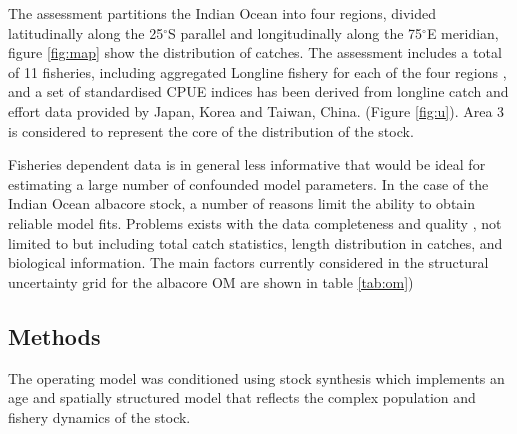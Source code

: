 \documentclass[a4paper]{article}
\begin{document}
The assessment partitions the Indian Ocean into four regions, divided latitudinally along the 25$^{\circ}$S parallel and longitudinally along the 75$^{\circ}$E meridian, 
 figure \ref{fig:map} show the distribution of catches. The assessment includes a total of 11 fisheries, including  aggregated Longline fishery for each of the four regions  \citep{LangleyH2016}, and a set of standardised CPUE indices has been derived from longline catch and effort data provided by Japan, Korea and Taiwan, China. \citep{HoyleKL2016} (Figure \ref{fig:u}). Area 3 is considered to represent the core of the distribution of the stock.

Fisheries dependent data is in general less informative that would be ideal for estimating a large number of confounded model parameters. In the case of the Indian Ocean albacore stock, a number of reasons limit the ability to obtain reliable model fits. Problems exists with the data completeness and quality \citep{IOTC2016WPTmT0607}, not limited to but including total catch statistics, length distribution in catches, and biological information. The main factors currently considered in the structural uncertainty grid for the albacore OM are shown in  table \ref{tab:om})


\subsection*{Methods}

The operating model was conditioned using stock synthesis \parencite[SS,][]{methot2013stock} which  implements an age and spatially structured model that reflects the complex population and fishery dynamics of the stock. 
\end{document}
